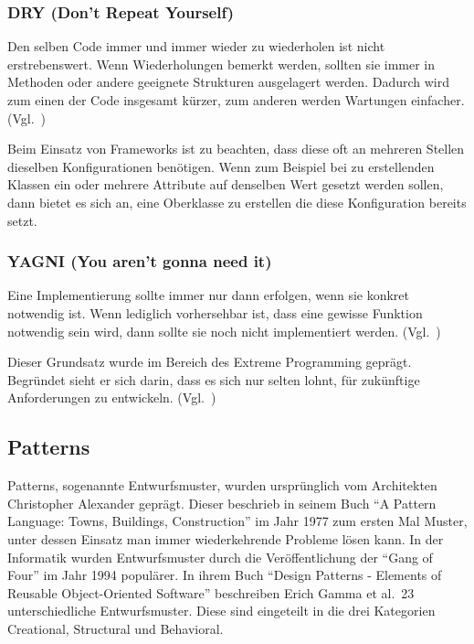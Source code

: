 \subsubsection{DRY (Don’t Repeat Yourself)}
Den selben Code immer und immer wieder zu wiederholen ist nicht erstrebenswert.
Wenn Wiederholungen bemerkt werden, sollten sie immer in Methoden oder andere geeignete Strukturen ausgelagert werden.
Dadurch wird zum einen der Code insgesamt kürzer, zum anderen werden Wartungen einfacher.
(Vgl.~\cite{the-pragmatic-programmer})

Beim Einsatz von Frameworks ist zu beachten, dass diese oft an mehreren Stellen dieselben Konfigurationen benötigen.
Wenn zum Beispiel bei zu erstellenden Klassen ein oder mehrere Attribute auf denselben Wert gesetzt werden sollen, dann bietet es sich an, eine Oberklasse zu erstellen die diese Konfiguration bereits setzt.

\subsubsection{YAGNI (You aren't gonna need it)}
Eine Implementierung sollte immer nur dann erfolgen, wenn sie konkret notwendig ist.
Wenn lediglich vorhersehbar ist, dass eine gewisse Funktion notwendig sein wird, dann sollte sie noch nicht implementiert werden.
(Vgl.~\cite{extreme-programming-installed})

Dieser Grundsatz wurde im Bereich des Extreme Programming geprägt.
Begründet sieht er sich darin, dass es sich nur selten lohnt, für zukünftige Anforderungen zu entwickeln.
(Vgl.~\cite{kiss-principle-explained})

\subsection{Patterns}
Patterns, sogenannte Entwurfsmuster, wurden ursprünglich vom Architekten Christopher Alexander geprägt.
Dieser beschrieb in seinem Buch \enquote{A Pattern Language: Towns, Buildings, Construction}\cite{a-pattern-language} im Jahr 1977 zum ersten Mal Muster, unter dessen Einsatz man immer wiederkehrende Probleme lösen kann.
In der Informatik wurden Entwurfsmuster durch die Veröffentlichung der \enquote{Gang of Four} im Jahr 1994 populärer.
In ihrem Buch \enquote{Design Patterns - Elements of Reusable Object-Oriented Software}\cite{gamma-design-patterns} beschreiben Erich Gamma et al.\ 23 unterschiedliche Entwurfsmuster.
Diese sind eingeteilt in die drei Kategorien Creational, Structural und Behavioral.

